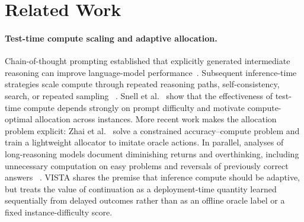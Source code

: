 \documentclass[a4paper,fleqn]{cas-sc}
\theoremstyle{plain}
\theoremstyle{definition}
\theoremstyle{remark}
\begin{document}
\section{Related Work}
\label{sec:related}

\paragraph{Test-time compute scaling and adaptive allocation.}
Chain-of-thought prompting established that explicitly generated intermediate
reasoning can improve language-model performance~\cite{wei2022cot,kojima2022zeroshot}.
Subsequent inference-time strategies scale compute through repeated reasoning
paths, self-consistency, search, or repeated sampling
~\cite{wang2023selfconsistency,yao2023tree,brown2024monkeys}.
Snell et al.~\cite{snell2025scaling} show that the effectiveness of test-time
compute depends strongly on prompt difficulty and motivate compute-optimal
allocation across instances. More recent work makes the allocation problem
explicit: Zhai et al.~\cite{zhai2026adaptive} solve a constrained
accuracy--compute problem and train a lightweight allocator to imitate oracle
actions. In parallel, analyses of long-reasoning models document diminishing
returns and overthinking, including unnecessary computation on easy problems
and reversals of previously correct answers
~\cite{chen2025overthinking,zhou2026overthinking}.
VISTA shares the premise that inference compute should be adaptive, but treats
the value of continuation as a deployment-time quantity learned sequentially
from delayed outcomes rather than as an offline oracle label or a fixed
instance-difficulty score.
\end{document}
